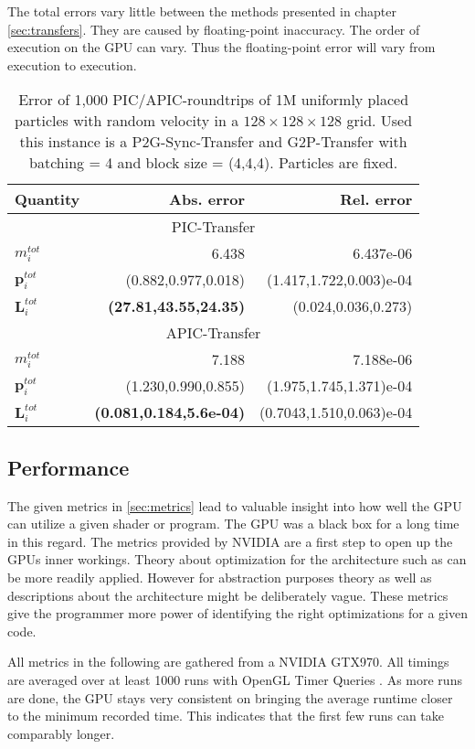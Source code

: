 \documentclass[m,times]{cgMA}
\begin{document}
The total errors vary little between the methods presented in chapter \ref{sec:transfers}. They are caused by floating-point inaccuracy. The order of execution on the GPU can vary. Thus the floating-point error will vary from execution to execution.
\begin{table}[t]
\centering
  \begin{tabular}{|l|r|r|}\hline
    Quantity& Abs. error  & Rel. error \\ \hline
    \multicolumn{3}{|c|}{PIC-Transfer}\\\hline
    $m^{tot}_i$ & 6.438     & 6.437e-06     \\\hline
    $\boldsymbol{p}^{tot}_i$  & (0.882,0.977,0.018)&(1.417,1.722,0.003)e-04 \\\hline
    $\boldsymbol{L}^{tot}_i$  & \textbf{(27.81,43.55,24.35)}&(0.024,0.036,0.273)\\\hline
    \multicolumn{3}{|c|}{APIC-Transfer}\\\hline
    $m^{tot}_i$ & 7.188     & 7.188e-06     \\\hline
    $\boldsymbol{p}^{tot}_i$  & (1.230,0.990,0.855)&(1.975,1.745,1.371)e-04 \\\hline
    $\boldsymbol{L}^{tot}_i$  & \textbf{(0.081,0.184,5.6e-04)}&(0.7043,1.510,0.063)e-04\\\hline
   \end{tabular}
   \caption{Error of 1,000 PIC/APIC-roundtrips of 1M uniformly placed particles with random velocity in a $128\times128\times128$ grid. Used this instance is a P2G-Sync-Transfer and G2P-Transfer with batching = 4 and block size = (4,4,4). Particles are fixed.}
  \label{tab:roundtrip}
\end{table}
\clearpage
\subsection{Performance}\label{sec:perf}
The given metrics in \ref{sec:metrics} lead to valuable insight into how well the GPU can utilize a given shader or program. The GPU was a black box for a long time in this regard. The metrics provided by NVIDIA are a first step to open up the GPUs inner workings. Theory about optimization for the architecture such as \cite{NVIDIA:BEST:PRACTICE} can be more readily applied. However for abstraction purposes theory as well as descriptions about the architecture might be deliberately vague. These metrics give the programmer more power of identifying the right optimizations for a given code.

All metrics in the following are gathered from a NVIDIA GTX970. All timings are averaged over at least 1000 runs with OpenGL Timer Queries \cite{KHRONOS:TIMER_QUERY}. As more runs are done, the GPU stays very consistent on bringing the average runtime closer to the minimum recorded time. This indicates that the first few runs can take comparably longer.
\end{document}
